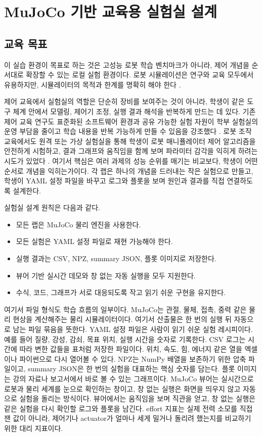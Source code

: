 \section{MuJoCo 기반 교육용 실험실 설계}

\subsection{교육 목표}

이 실습 환경이 목표로 하는 것은 고성능 로봇 학습 벤치마크가 아니라, 제어 개념을 순서대로 확장할 수 있는 로컬 실험 환경이다.
로봇 시뮬레이션은 연구와 교육 모두에서 유용하지만, 시뮬레이터의 목적과 한계를 명확히 해야 한다 \cite{choi2021simulationrobotics,collins2021physicsreview}.

제어 교육에서 실험실의 역할은 단순히 장비를 보여주는 것이 아니라, 학생이 같은 도구 체계 안에서 모델링, 제어기 조정, 실행 결과 해석을 반복하게 만드는 데 있다.
기존 제어 교육 연구도 표준화된 소프트웨어 환경과 공유 가능한 실험 자원이 학부 실험실의 운영 부담을 줄이고 학습 내용을 반복 가능하게 만들 수 있음을 강조했다 \cite{dixon2002matlablab}.
로봇 조작 교육에서도 원격 또는 가상 실험실을 통해 학생이 로봇 매니퓰레이터 제어 알고리즘을 안전하게 시험하고, 결과 그래프와 움직임을 함께 보며 파라미터 감각을 익히게 하려는 시도가 있었다 \cite{sartorius2006virtualremote,hoenig2016seamless}.
여기서 핵심은 여러 과제의 성능 순위를 매기는 비교보다, 학생이 어떤 순서로 개념을 익히는가이다.
각 랩은 하나의 개념을 드러내는 작은 실험으로 만들고, 학생이 YAML 설정 파일을 바꾸고 로그와 플롯을 보며 원인과 결과를 직접 연결하도록 설계한다.

실험실 설계 원칙은 다음과 같다.
\begin{itemize}
  \item 모든 랩은 MuJoCo 물리 엔진을 사용한다.
  \item 모든 실험은 YAML 설정 파일로 재현 가능해야 한다.
  \item 실행 결과는 CSV, NPZ, summary JSON, 플롯 이미지로 저장한다.
  \item 뷰어 기반 실시간 데모와 창 없는 자동 실행을 모두 지원한다.
  \item 수식, 코드, 그래프가 서로 대응되도록 작고 읽기 쉬운 구현을 유지한다.
\end{itemize}

여기서 파일 형식도 학습 흐름의 일부이다.
MuJoCo는 관절, 물체, 접촉, 중력 같은 물리 현상을 계산해주는 물리 시뮬레이터이다.
여기서 산출물은 한 번의 실행 뒤 자동으로 남는 파일 묶음을 뜻한다.
YAML 설정 파일은 사람이 읽기 쉬운 실험 레시피이다.
예를 들어 질량, 강성, 감쇠, 목표 위치, 실행 시간을 숫자로 기록한다.
CSV 로그는 시간에 따라 변한 값들을 표처럼 저장한 파일이다.
위치, 속도, 힘, 에너지 같은 열을 엑셀이나 파이썬으로 다시 열어볼 수 있다.
NPZ는 NumPy 배열을 보존하기 위한 압축 파일이고, summary JSON은 한 번의 실험을 대표하는 핵심 숫자를 담는다.
플롯 이미지는 강의 자료나 보고서에서 바로 볼 수 있는 그래프이다.
MuJoCo 뷰어는 실시간으로 로봇과 물리 세계를 눈으로 확인하는 창이고, 창 없는 실행은 화면을 띄우지 않고 자동으로 실험을 돌리는 방식이다.
뷰어에서는 움직임을 보며 직관을 얻고, 창 없는 실행은 같은 실험을 다시 확인할 로그와 플롯을 남긴다.
effort 지표는 실제 전력 소모를 직접 잰 값이 아니라, 제어기나 actuator가 얼마나 세게 밀거나 돌리려 했는지를 비교하기 위한 대리 지표이다.


